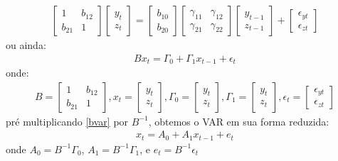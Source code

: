 \documentclass[11pt,a4paper]{article}
\begin{document}
\begin{align*}
\begin{bmatrix}
1 & b_{12} \\
b_{21} & 1 
\end{bmatrix}
\begin{bmatrix}
y_t \\
z_t
\end{bmatrix}
=
\begin{bmatrix}
b_{10}\\
b_{20}
\end{bmatrix}
\begin{bmatrix}
\gamma_{11} & \gamma_{12} \\
\gamma_{21} & \gamma_{22}
\end{bmatrix}
\begin{bmatrix}
y_{t-1}\\
z_{t-1}
\end{bmatrix}
+
\begin{bmatrix}
\epsilon_{yt}\\
\epsilon_{zt}
\end{bmatrix}
\end{align*}
\noindent
ou ainda:
\begin{align} \label{bvar}
Bx_t = \Gamma_0 + \Gamma_1 x_{t-1} + \epsilon_t
\end{align}
\noindent
onde:
\begin{align*}
B= \begin{bmatrix}
1 & b_{12} \\
b_{21} & 1 
\end{bmatrix}, x_t = \begin{bmatrix}
y_t \\
z_t
\end{bmatrix}, \Gamma_0 = \begin{bmatrix}
y_t \\
z_t
\end{bmatrix}, \Gamma_1 = \begin{bmatrix}
y_t \\
z_t
\end{bmatrix}, \epsilon_t = \begin{bmatrix}
\epsilon_{yt}\\
\epsilon_{zt}
\end{bmatrix}
\end{align*}
\noindent
pré multiplicando \ref{bvar} por $B^{-1}$, obtemos o VAR em sua forma reduzida:
\begin{align}
x_t = A_0 + A_1 x_{t-1} + e_t
\end{align}
\noindent
onde $A_0 = B^{-1}\Gamma_0$, $A_1 = B^{-1}\Gamma_1$, e $e_t = B^{-1}\epsilon_t$
\end{document}
